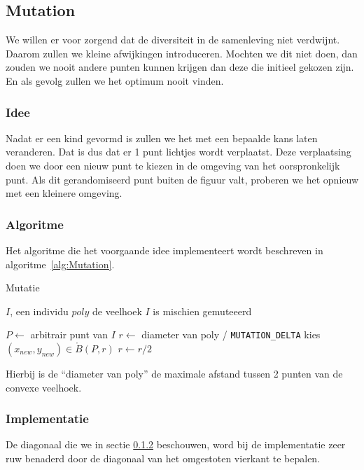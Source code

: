 %
\subsection{Mutation}
\label{sub:Mutation}
We willen er voor zorgend dat de diversiteit in de samenleving niet verdwijnt. Daarom zullen we kleine afwijkingen introduceren. Mochten we dit niet doen, dan zouden we nooit andere punten kunnen krijgen dan deze die initieel gekozen zijn. En als gevolg zullen we het optimum nooit vinden.

\subsubsection{Idee}
Nadat er een kind gevormd is zullen we het met een bepaalde kans laten veranderen. Dat is dus dat er 1 punt lichtjes wordt verplaatst. Deze verplaatsing doen we door een nieuw punt te kiezen in de omgeving van het oorspronkelijk punt. Als dit gerandomiseerd punt buiten de figuur valt, proberen we het opnieuw met een kleinere omgeving.

\subsubsection{Algoritme}
\label{ssub:MutationAlgorithm}
Het algoritme die het voorgaande idee implementeert wordt beschreven in algoritme~\ref{alg:Mutation}.
	\begin{algorithm}
	 	\caption{Mutatie}
		\begin{algorithmic}
		\Require \State $I$, een individu \State $poly$ de veelhoek
		\Ensure $I$ is mischien gemuteeerd 
		
			\State $P \gets$ arbitrair punt van $I$ 
			\State $r \gets$ diameter van poly / \texttt{MUTATION\_DELTA}
			\Repeat 
			\State kies $(x_{new},y_{new}) \in \mathring{B}(P,r)$
			\State $r \gets r/2$
		\EndIf		
		\end{algorithmic}
		\label{alg:Mutation}
	\end{algorithm}		
Hierbij is de ``diameter van poly'' de maximale afstand tussen 2 punten van de convexe veelhoek.

\subsubsection{Implementatie}
\label{ssub:MutationImplementation}
De diagonaal die we in sectie \ref{ssub:MutationAlgorithm} beschouwen, word bij de implementatie zeer ruw benaderd door de diagonaal van het omgestoten vierkant te bepalen.

